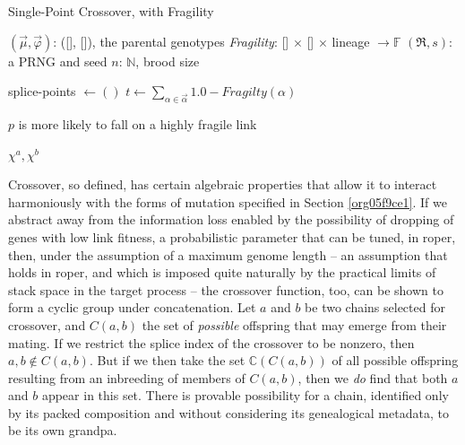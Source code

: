 \documentclass[12pt,glossary]{dalthesis}
\begin{document}
\begin{algorithm}
\caption{Single-Point Crossover, with Fragility} \label{alg:crossover}
\begin{algorithmic}[1]

\REQUIRE $(\vec{\mu}, \vec{\varphi})$: ([\!], [\!]), the parental genotypes 
\REQUIRE \emph{Fragility}: [\!] $\times$ [\!] $\times$ lineage $\to \mathbb{F}$ 
\REQUIRE $(\mathfrak{R}, s)$: a PRNG and seed \REQUIRE $n$: $\mathbb{N}$, brood size


\STATE
{splice-points $\gets ()$}  \FOR {$\vec{\alpha} \in (\vec{\mu }, \vec{\varphi})$} 
\STATE
{$t \gets \sum_{\alpha \in \vec{\alpha}} 1.0 - \textit{Fragilty}(\alpha)$}

 \COMMENT
{$p$ is more likely to fall on a highly fragile link} 

  
 \ENDWHILE 
{} \ENDFOR 
{} 

 \RETURN
{$\chi^a, \chi^b$} 
\end{algorithmic} 
\end{algorithm}

Crossover, so defined, has certain algebraic properties that allow it
to interact harmoniously with the forms of mutation specified in 
Section \ref{org05f9ce1}. If we abstract away from the information loss
enabled by the possibility of dropping of genes with low link fitness, a
probabilistic parameter that can be tuned, in \gls{roper}, then, under the
assumption of a maximum genome length -- an assumption that holds in \gls{roper},
and which is imposed quite naturally by the practical limits of stack space in
the target process -- the crossover function, too, can be shown to form a cyclic group
under concatenation. Let \(a\) and \(b\) be two chains selected for crossover, and 
\(C(a,b)\) the set of \emph{possible} offspring that may emerge from their mating. If
we restrict the splice index of the crossover to be nonzero, then \(a,b \not \in C(a,b)\).
But if we then take the set \(\mathbb{C}(C(a,b))\) of all possible offspring resulting
from an inbreeding of members of \(C(a,b)\), then we \emph{do} find that both \(a\) and \(b\)
appear in this set. There is provable possibility for a chain, identified only by
its packed composition and without considering its genealogical metadata, to be its
own grandpa. 
\end{document}
